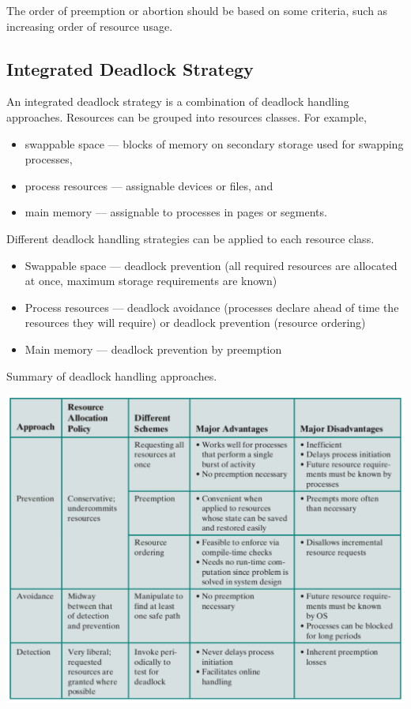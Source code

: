 The order of preemption or abortion should be based on some criteria, such as increasing order of resource usage.

\subsection{Integrated Deadlock Strategy}

An integrated deadlock strategy is a combination of deadlock handling approaches.
Resources can be grouped into resources classes.
For example,
\begin{itemize}
  \item swappable space --- blocks of memory on secondary storage used for swapping processes,
  \item process resources --- assignable devices or files, and
  \item main memory --- assignable to processes in pages or segments.
\end{itemize}

Different deadlock handling strategies can be applied to each resource class.
\begin{itemize}
  \item Swappable space --- deadlock prevention (all required resources are allocated at once, maximum storage requirements are known)
  \item Process resources --- deadlock avoidance (processes declare ahead of time the resources they will require) or deadlock prevention (resource ordering)
  \item Main memory --- deadlock prevention by preemption
\end{itemize}

\begin{table}[htp]
  \centering
  \caption*{Summary of deadlock handling approaches.}
  \includegraphics[width=15cm]{unit-15/figures/deadlock-summary.png}
\end{table}
